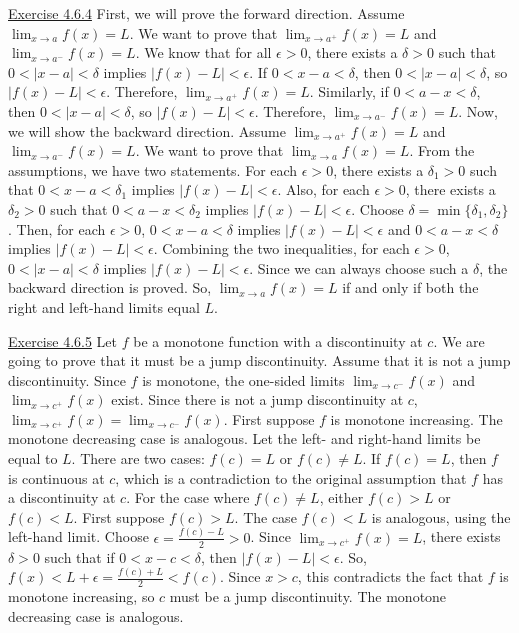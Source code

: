 \documentclass{exam}
\begin{document}
\underline{Exercise 4.6.4}
\newline
\newline
First, we will prove the forward direction. Assume $\lim_{x\to a}f(x)=L$. We want to prove that $\lim_{x\to a^+}f(x)=L$ and $\lim_{x\to a^-}f(x)=L$. We know that for all $\epsilon>0$, there exists a $\delta>0$ such that $0<|x-a|<\delta$ implies $|f(x)-L|<\epsilon$. If $0<x-a<\delta$, then $0<|x-a|<\delta$, so $|f(x)-L|<\epsilon$. Therefore, $\lim_{x\to a^+}f(x)=L$. Similarly, if $0<a-x<\delta$, then $0<|x-a|<\delta$, so $|f(x)-L|<\epsilon$. Therefore, $\lim_{x\to a^-}f(x)=L$.
\newline
\newline
Now, we will show the backward direction. Assume $\lim_{x\to a^+}f(x)=L$ and $\lim_{x\to a^-}f(x)=L$. We want to prove that $\lim_{x\to a}f(x)=L$. From the assumptions, we have two statements. For each $\epsilon>0$, there exists a $\delta_1>0$ such that $0<x-a<\delta_1$ implies $|f(x)-L|<\epsilon$. Also, for each $\epsilon>0$, there exists a $\delta_2>0$ such that $0<a-x<\delta_2$ implies $|f(x)-L|<\epsilon$. Choose $\delta=\min\{\delta_1,\delta_2\}$. Then, for each $\epsilon>0$, $0<x-a<\delta$ implies $|f(x)-L|<\epsilon$ and $0<a-x<\delta$ implies $|f(x)-L|<\epsilon$. Combining the two inequalities, for each $\epsilon>0$, $0<|x-a|<\delta$ implies $|f(x)-L|<\epsilon$. Since we can always choose such a $\delta$, the backward direction is proved. So, $\lim_{x\to a}f(x)=L$ if and only if both the right and left-hand limits equal $L$.
\newline

\underline{Exercise 4.6.5}
\newline
\newline
Let $f$ be a monotone function with a discontinuity at $c$. We are going to prove that it must be a jump discontinuity. Assume that it is not a jump discontinuity. Since $f$ is monotone, the one-sided limits $\lim_{x\to c^-}f(x)$ and $\lim_{x\to c^+}f(x)$ exist. Since there is not a jump discontinuity at $c$, $\lim_{x\to c^+}f(x)=\lim_{x\to c^-}f(x)$. First suppose $f$ is monotone increasing. The monotone decreasing case is analogous. Let the left- and right-hand limits be equal to $L$. There are two cases: $f(c)=L$ or $f(c)\ne L$. If $f(c)=L$, then $f$ is continuous at $c$, which is a contradiction to the original assumption that $f$ has a discontinuity at $c$. For the case where $f(c)\ne L$, either $f(c)>L$ or $f(c)<L$. First suppose $f(c)>L$. The case $f(c)<L$ is analogous, using the left-hand limit. Choose $\epsilon=\frac{f(c)-L}{2}>0$. Since \(\lim_{x\to c^+}f(x)=L\), there exists \(\delta>0\) such that if $0<x-c<\delta$, then $|f(x)-L|<\epsilon$. So, $f(x)<L+\epsilon=\frac{f(c)+L}{2}<f(c)$. Since $x>c$, this contradicts the fact that $f$ is monotone increasing, so $c$ must be a jump discontinuity. The monotone decreasing case is analogous.
\newline
\end{document}
